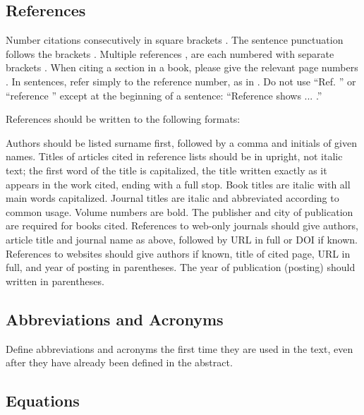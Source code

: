 \documentclass{fullpaper_hutech_v1.02}
\begin{document}
\subsection{References}

Number citations consecutively in square brackets \cite{True00}. The sentence punctuation follows the brackets \cite{Schluter00}. Multiple references \cite{Schluter00}, \cite{Plazzo11} are each numbered with separate brackets \cite{True00,Schluter00,Plazzo11}. When citing a section in a book, please give the relevant page numbers \cite{Schluter00}. In sentences, refer simply to the reference number, as in \cite{Plazzo11}. Do not use ``Ref. \cite{Plazzo11}'' or ``reference \cite{Plazzo11}'' except at the beginning of a sentence: ``Reference \cite{Plazzo11} shows ... .''

References should be written to the following formats:

Authors should be listed surname first, followed by a comma and initials of given names. Titles of articles cited in reference lists should be in upright, not italic text; the first word of the title is capitalized, the title written exactly as it appears in the work cited, ending with a full stop. Book titles are italic with all main words capitalized. Journal titles are italic and abbreviated according to common usage. Volume numbers are bold. The publisher and city of publication are required for books cited. References to web-only journals should give authors, article title and journal name as above, followed by URL in full or DOI if known. References to websites should give authors if known, title of cited page, URL in full, and year of posting in parentheses. The year of publication (posting) should written in parentheses.

\subsection{Abbreviations and Acronyms}

Define abbreviations and acronyms the first time they are used in the text, even after they have already been defined in the abstract.

\subsection{Equations}
\end{document}
